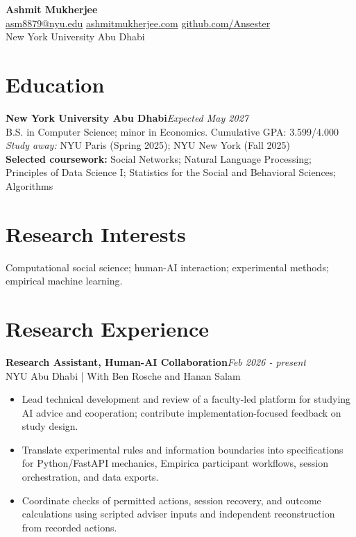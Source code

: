 \documentclass[a4paper,11pt]{article}
\newcommand{\entry}[2]{\textbf{#1}\hfill\textit{#2}}
\begin{document}
{\LARGE\bfseries Ashmit Mukherjee}\\[3pt]
\href{mailto:asm8879@nyu.edu}{asm8879@nyu.edu} \quad
\href{https://ashmitmukherjee.com}{ashmitmukherjee.com} \quad
\href{https://github.com/Ansester}{github.com/Ansester}\\
New York University Abu Dhabi

\section*{Education}
\entry{New York University Abu Dhabi}{Expected May 2027}\\
B.S. in Computer Science; minor in Economics. Cumulative GPA: 3.599/4.000\\
\textit{Study away:} NYU Paris (Spring 2025); NYU New York (Fall 2025)\\
\textbf{Selected coursework:} Social Networks; Natural Language Processing; Principles of Data Science I; Statistics for the Social and Behavioral Sciences; Algorithms

\section*{Research Interests}
Computational social science; human-AI interaction; experimental methods; empirical machine learning.

\section*{Research Experience}
\entry{Research Assistant, Human-AI Collaboration}{Feb 2026 - present}\\
NYU Abu Dhabi \;|\; With Ben Rosche and Hanan Salam
\begin{itemize}
\item Lead technical development and review of a faculty-led platform for studying AI advice and cooperation; contribute implementation-focused feedback on study design.
\item Translate experimental rules and information boundaries into specifications for Python/FastAPI mechanics, Empirica participant workflows, session orchestration, and data exports.
\item Coordinate checks of permitted actions, session recovery, and outcome calculations using scripted adviser inputs and independent reconstruction from recorded actions.
\end{itemize}
\end{document}
